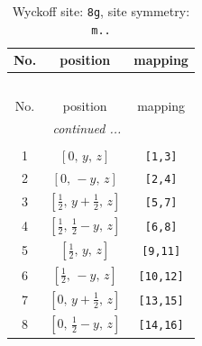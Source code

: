 \documentclass[fleqn,8pt]{jsarticle}
\begin{document}
\begin{longtable}{ccc}
\caption{Wyckoff site: {\tt 8g}, site symmetry: {\tt m..}}
 \\
 \hline \hline
No. & position & mapping \\ \hline \endfirsthead

\multicolumn{2}{l}{\tablename\ \thetable{}} \\
 \hline \hline
No. & position & mapping \\ \hline \endhead

 \hline \hline
\multicolumn{2}{r}{\footnotesize\it continued ...} \\ \endfoot

 \hline \hline
\multicolumn{2}{r}{} \\ \endlastfoot

1 & $\left[ 0,\, y,\, z \right]$ & {\tt [1,3]} \\ \hline
2 & $\left[ 0,\, - y,\, z \right]$ & {\tt [2,4]} \\ \hline
3 & $\left[ \frac{1}{2},\, y + \frac{1}{2},\, z \right]$ & {\tt [5,7]} \\ \hline
4 & $\left[ \frac{1}{2},\, \frac{1}{2} - y,\, z \right]$ & {\tt [6,8]} \\ \hline
5 & $\left[ \frac{1}{2},\, y,\, z \right]$ & {\tt [9,11]} \\ \hline
6 & $\left[ \frac{1}{2},\, - y,\, z \right]$ & {\tt [10,12]} \\ \hline
7 & $\left[ 0,\, y + \frac{1}{2},\, z \right]$ & {\tt [13,15]} \\ \hline
8 & $\left[ 0,\, \frac{1}{2} - y,\, z \right]$ & {\tt [14,16]} \\
\end{longtable}
\renewcommand{\arraystretch}{1.2}
\end{document}
